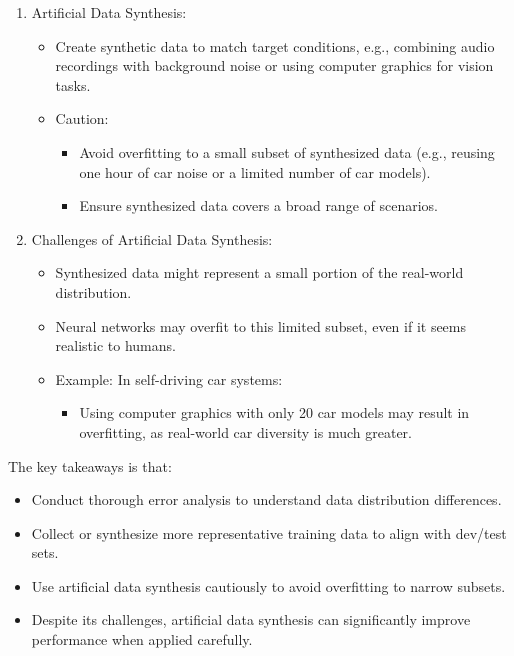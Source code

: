 \documentclass[letterpaper,12pt,notitlepage,twoside]{report}
\begin{document}
\begin{enumerate}
\item Artificial Data Synthesis:
\begin{itemize}
    \item Create synthetic data to match target conditions, e.g., combining audio recordings with background noise or using computer graphics for vision tasks.
    \item Caution:
    \begin{itemize}
        \item Avoid overfitting to a small subset of synthesized data (e.g., reusing one hour of car noise or a limited number of car models).
        \item Ensure synthesized data covers a broad range of scenarios.
    \end{itemize}
\end{itemize}

\item Challenges of Artificial Data Synthesis:
\begin{itemize}
    \item Synthesized data might represent a small portion of the real-world distribution.
    \item Neural networks may overfit to this limited subset, even if it seems realistic to humans.
    \item Example: In self-driving car systems:
    \begin{itemize}
        \item Using computer graphics with only 20 car models may result in overfitting, as real-world car diversity is much greater.
    \end{itemize}
\end{itemize}
\end{enumerate}

The key takeaways is that:
\begin{itemize}[nosep]
    \item Conduct thorough error analysis to understand data distribution differences.
    \item Collect or synthesize more representative training data to align with dev/test sets.
    \item Use artificial data synthesis cautiously to avoid overfitting to narrow subsets.
    \item Despite its challenges, artificial data synthesis can significantly improve performance when applied carefully.
\end{itemize}

\end{document}
